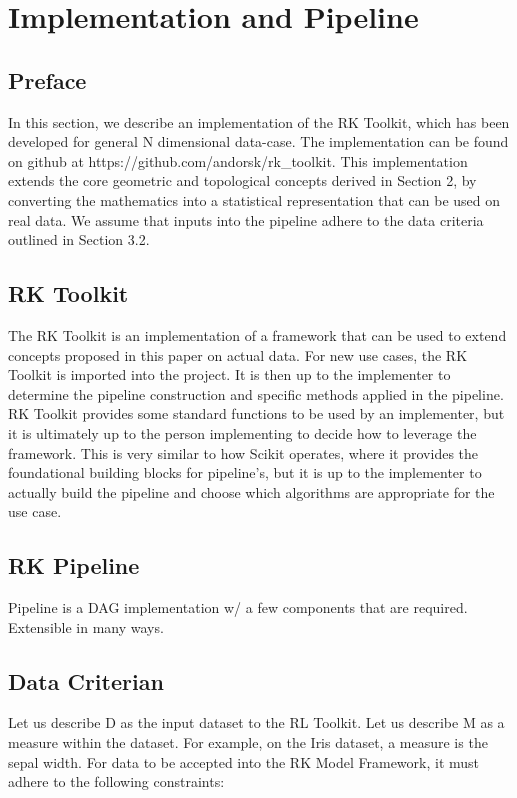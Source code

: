 \section{Implementation and Pipeline}

\subsection{Preface}
In this section, we describe an implementation of the RK Toolkit, which has been developed for general N dimensional data-case. The implementation can be found on github at https://github.com/andorsk/rk\_toolkit. This implementation extends the core geometric and topological concepts derived in Section 2, by converting the mathematics into a statistical representation that can be used on real data. We assume that inputs into the pipeline adhere to the data criteria outlined in Section 3.2.

\subsection{RK Toolkit}
The RK Toolkit is an implementation of a framework that can be used to extend concepts proposed in this paper on actual data. For new use cases, the RK Toolkit is imported into the project. It is then up to the implementer to determine the pipeline construction and specific methods applied in the pipeline. RK Toolkit provides some standard functions to be used by an implementer, but it is ultimately up to the person implementing to decide how to leverage the framework. This is very similar to how Scikit operates, where it provides the foundational building blocks for pipeline’s, but it is up to the implementer to actually build the pipeline and choose which algorithms are appropriate for the use case.

\subsection{RK Pipeline}
Pipeline is a DAG implementation w/ a few components that are required.
Extensible in many ways.

\subsection{Data Criterian}
Let us describe D as the input dataset to the RL Toolkit. Let us describe M as a measure within the dataset. For example, on the Iris dataset, a measure is the sepal width. For data to be accepted into the RK Model Framework, it must adhere to the following constraints:

